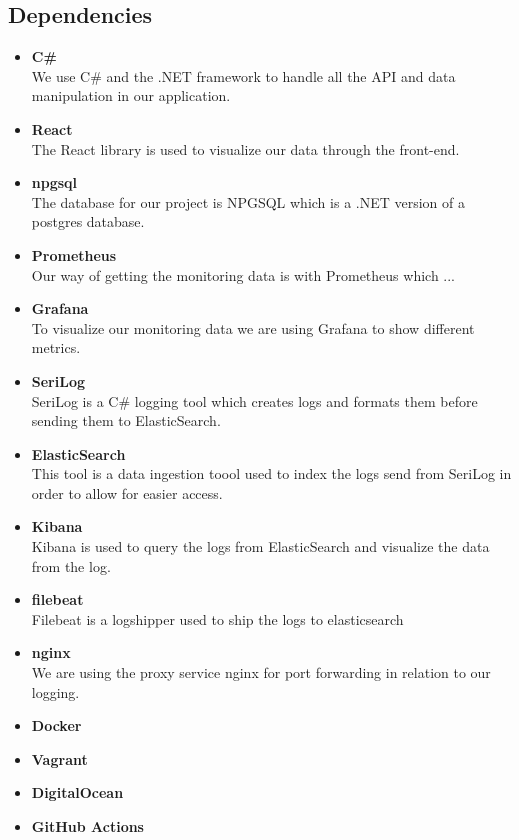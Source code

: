 \documentclass{article}
\begin{document}
\subsection{Dependencies}
\begin{itemize}
    \item \textbf{C\#}\\
    We use C\# and the .NET framework to handle all the API and data manipulation in our application. 
    \item \textbf{React}\\
    The React library is used to visualize our data through the front-end.
    \item \textbf{npgsql}\\
    The database for our project is NPGSQL which is a .NET version of a postgres database.
    \item \textbf{Prometheus}\\
    Our way of getting the monitoring data is with Prometheus which ... %
    \item \textbf{Grafana}\\
    To visualize our monitoring data we are using Grafana to show different metrics.
    \item \textbf{SeriLog}\\
    SeriLog is a C\# logging tool which creates logs and formats them before sending them to ElasticSearch.
    \item \textbf{ElasticSearch}\\
    This tool is a data ingestion toool used to index the logs send from SeriLog in order to allow for easier access.
    \item \textbf{Kibana}\\
    Kibana is used to query the logs from ElasticSearch and visualize the data from the log.
    \item \textbf{filebeat}\\
    Filebeat is a logshipper used to ship the logs to elasticsearch
    \item \textbf{nginx}\\
    We are using the proxy service nginx for port forwarding in relation to our logging.
    \item \textbf{Docker}\\
    \item \textbf{Vagrant}\\
    \item \textbf{DigitalOcean}\\
    \item \textbf{GitHub Actions}\\
\end{itemize}
\end{document}
